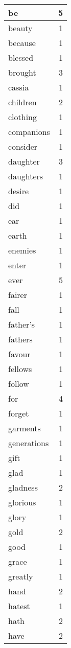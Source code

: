 \begin{center}
\begin{longtable}{l|r}
be & 5\\ \hline 
beauty & 1\\ \hline 
because & 1\\ \hline 
blessed & 1\\ \hline 
brought & 3\\ \hline 
cassia & 1\\ \hline 
children & 2\\ \hline 
clothing & 1\\ \hline 
companions & 1\\ \hline 
consider & 1\\ \hline 
daughter & 3\\ \hline 
daughters & 1\\ \hline 
desire & 1\\ \hline 
did & 1\\ \hline 
ear & 1\\ \hline 
earth & 1\\ \hline 
enemies & 1\\ \hline 
enter & 1\\ \hline 
ever & 5\\ \hline 
fairer & 1\\ \hline 
fall & 1\\ \hline 
father's & 1\\ \hline 
fathers & 1\\ \hline 
favour & 1\\ \hline 
fellows & 1\\ \hline 
follow & 1\\ \hline 
for & 4\\ \hline 
forget & 1\\ \hline 
garments & 1\\ \hline 
generations & 1\\ \hline 
gift & 1\\ \hline 
glad & 1\\ \hline 
gladness & 2\\ \hline 
glorious & 1\\ \hline 
glory & 1\\ \hline 
gold & 2\\ \hline 
good & 1\\ \hline 
grace & 1\\ \hline 
greatly & 1\\ \hline 
hand & 2\\ \hline 
hatest & 1\\ \hline 
hath & 2\\ \hline 
have & 2\\ \hline 

\end{longtable}
\end{center}
